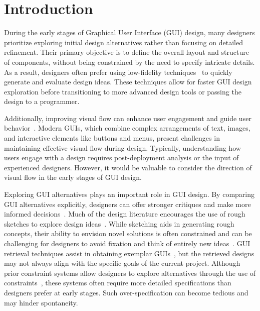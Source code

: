 \section{Introduction}

During the early stages of Graphical User Interface (GUI) design, many designers prioritize exploring initial design alternatives rather than focusing on detailed refinement. Their primary objective is to define the overall layout and structure of components, without being constrained by the need to specify intricate details. As a result, designers often prefer using low-fidelity techniques~\cite{rettig1994prototyping} to quickly generate and evaluate design ideas. These techniques allow for faster GUI design exploration before transitioning to more advanced design tools or passing the design to a programmer.

Additionally, improving visual flow can enhance user engagement and guide user behavior~\cite{Rosenholtz11, Still10, ueyes}. Modern GUIs, which combine complex arrangements of text, images, and interactive elements like buttons and menus, present challenges in maintaining effective visual flow during design. Typically, understanding how users engage with a design requires post-deployment analysis or the input of experienced designers. However, it would be valuable to consider the direction of visual flow in the early stages of GUI design.

Exploring GUI alternatives plays an important role in GUI design. By comparing GUI alternatives explicitly, designers can offer stronger critiques and make more informed decisions~\cite{dow2011prototyping, tohidi2006getting}. Much of the design literature encourages the use of rough sketches to explore design ideas~\cite{boyarski1994computers, landay1996silk}. While sketching aids in generating rough concepts, their ability to envision novel solutions is often constrained and can be challenging for designers to avoid fixation and think of entirely new ideas~\cite{jansson1991design}. GUI retrieval techniques assist in obtaining exemplar GUIs~\cite{herring2009getting, kumar2013webzeitgeist, li2021screen2vec}, but the retrieved designs may not always align with the specific goals of the current project. Although prior constraint systems allow designers to explore alternatives through the use of constraints~\cite{swearngin2020scout}, these systems often require more detailed specifications than designers prefer at early stages. Such over-specification can become tedious and may hinder spontaneity.


